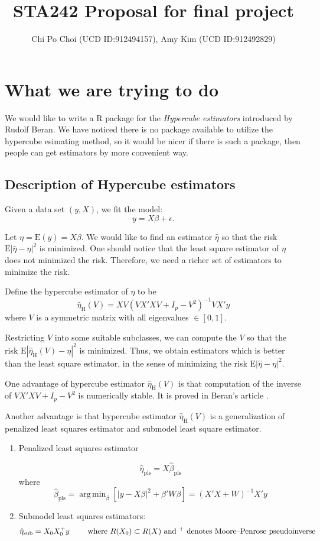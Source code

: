 \documentclass[draft]{article}
\title{STA242 Proposal for final project}
\author{Chi Po Choi (UCD ID:912494157), Amy Kim (UCD ID:912492829)}
\DeclareMathOperator*{\argmin}{arg\,min}
\begin{document}
\maketitle

\section{What we are trying to do}
We would like to write a R package for the \emph{Hypercube estimators} \cite{beran2014hypercube} introduced by Rudolf Beran. We have noticed there is no package available to utilize the hypercube esimating method, so it would be nicer if there is such a package, then people can get estimators by more convenient way. 

\subsection{Description of Hypercube estimators}
Given a data set $(y, X)$, we fit the model:
$$
y = X\beta + \epsilon.
$$

Let $\eta = \text{E}(y) = X\beta$. We would like to find an estimator $\hat{\eta}$ so that the risk $\text{E} | \hat{\eta} - \eta|^2$ is minimized. One should notice that the least square estimator of $\eta$ does not minimized the risk. Therefore, we need a richer set of estimators to minimize the risk.

Define the hypercube estimator of $\eta$ to be
$$
\hat{\eta}_\text{H} (V) = X V (V X'X V + I_p - V^2)^{-1} V X' y
$$
where $V$ is a symmetric matrix with all eigenvalues $\in [0,1]$.

Restricting $V$ into some suitable subclasses, we can compute the $V$ so that the risk $\text{E} | \hat{\eta}_\text{H}(V) - \eta|^2$ is minimized. Thus, we obtain estimators which is better than the least square estimator, in the sense of minimizing the risk $\text{E} | \hat{\eta} - \eta|^2$.

One advantage of hypercube estimator $\hat{\eta}_\text{H} (V)$ is that computation of the inverse of $V X'X V + I_p - V^2$ is numerically stable. It is proved in Beran's article \cite{beran2014hypercube}.

Another advantage is that hypercube estimator $\hat{\eta}_\text{H} (V)$ is a generalization of penalized least squares estimator and submodel least square estimator.

\begin{enumerate}
	\item Penalized least squares estimator

	$$
		\hat{\eta}_\text{pls} = X \hat{\beta}_\text{pls}
	$$
	where 
	$$
		\hat{\beta}_\text{pls} = \argmin_{\beta} [ | y - X\beta |^2 + \beta' W \beta ] = (X'X + W)^{-1} X' y 
	$$
	\item Submodel least squares estimators:
	$$
		\hat{\eta}_\text{sub} = X_0 X_0^+ y \qquad \text{ where $R(X_0) \subset R(X)$ and \textsuperscript{+} denotes Moore–Penrose pseudoinverse}
	$$
\end{enumerate}
\end{document}
